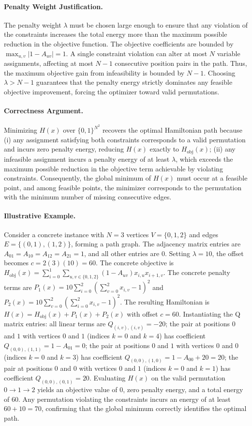 \documentclass[12pt]{article}
\begin{document}
\paragraph{Penalty Weight Justification.}
The penalty weight $\lambda$ must be chosen large enough to ensure that any violation of the constraints increases the total energy more than the maximum possible reduction in the objective function. The objective coefficients are bounded by $\max_{u,v} |1 - A_{uv}| = 1$. A single constraint violation can alter at most $N$ variable assignments, affecting at most $N-1$ consecutive position pairs in the path. Thus, the maximum objective gain from infeasibility is bounded by $N-1$. Choosing $\lambda > N-1$ guarantees that the penalty energy strictly dominates any feasible objective improvement, forcing the optimizer toward valid permutations.

\paragraph{Correctness Argument.}
Minimizing $H(x)$ over $\{0,1\}^{N^2}$ recovers the optimal Hamiltonian path because (i) any assignment satisfying both constraints corresponds to a valid permutation and incurs zero penalty energy, reducing $H(x)$ exactly to $H_{\text{obj}}(x)$; (ii) any infeasible assignment incurs a penalty energy of at least $\lambda$, which exceeds the maximum possible reduction in the objective term achievable by violating constraints. Consequently, the global minimum of $H(x)$ must occur at a feasible point, and among feasible points, the minimizer corresponds to the permutation with the minimum number of missing consecutive edges.

\paragraph{Illustrative Example.}
Consider a concrete instance with $N=3$ vertices $V=\{0,1,2\}$ and edges $E=\{(0,1), (1,2)\}$, forming a path graph. The adjacency matrix entries are $A_{01}=A_{10}=A_{12}=A_{21}=1$, and all other entries are $0$. Setting $\lambda=10$, the offset becomes $c = 2(3)(10) = 60$. The concrete objective is $H_{\text{obj}}(x) = \sum_{i=0}^{1} \sum_{u,v \in \{0,1,2\}} (1 - A_{uv}) x_{i,u} x_{i+1,v}$. The concrete penalty terms are $P_1(x) = 10 \sum_{i=0}^{2} (\sum_{v=0}^{2} x_{i,v} - 1)^2$ and $P_2(x) = 10 \sum_{v=0}^{2} (\sum_{i=0}^{2} x_{i,v} - 1)^2$. The resulting Hamiltonian is $H(x) = H_{\text{obj}}(x) + P_1(x) + P_2(x)$ with offset $c=60$. Instantiating the Q matrix entries: all linear terms are $Q_{(i,v),(i,v)} = -20$; the pair at positions $0$ and $1$ with vertices $0$ and $1$ (indices $k=0$ and $k=4$) has coefficient $Q_{(0,0),(1,1)} = 1 - A_{01} = 0$; the pair at positions $0$ and $1$ with vertices $0$ and $0$ (indices $k=0$ and $k=3$) has coefficient $Q_{(0,0),(1,0)} = 1 - A_{00} + 20 = 20$; the pair at positions $0$ and $0$ with vertices $0$ and $1$ (indices $k=0$ and $k=1$) has coefficient $Q_{(0,0),(0,1)} = 20$. Evaluating $H(x)$ on the valid permutation $0 \to 1 \to 2$ yields an objective value of $0$, zero penalty energy, and a total energy of $60$. Any permutation violating the constraints incurs an energy of at least $60 + 10 = 70$, confirming that the global minimum correctly identifies the optimal path.
\end{document}
